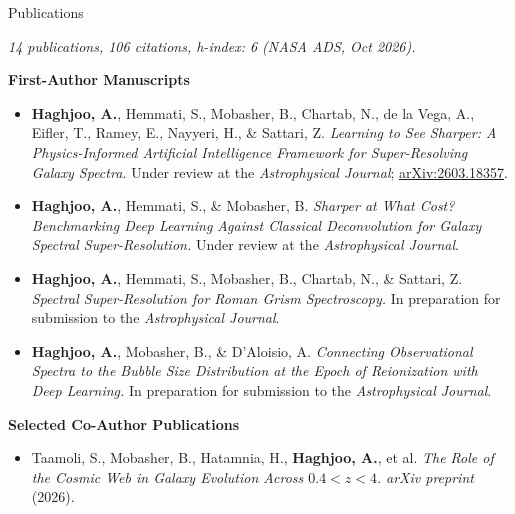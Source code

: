 \documentclass[]{kyvernitis-resume}
\begin{document}
\begin{section}{Publications}

\textit{14 publications, 106 citations, h-index: 6 (NASA ADS, Oct 2026).}

\vspace{0.2cm}

\textbf{First-Author Manuscripts}

\begin{itemize}

\item \textbf{Haghjoo, A.}, Hemmati, S., Mobasher, B., Chartab, N., de la Vega, A., Eifler, T., Ramey, E., Nayyeri, H., \& Sattari, Z.
\textit{Learning to See Sharper: A Physics-Informed Artificial Intelligence Framework for Super-Resolving Galaxy Spectra.}
Under review at the \textit{Astrophysical Journal}; \href{https://arxiv.org/abs/2603.18357}{arXiv:2603.18357}.

\item \textbf{Haghjoo, A.}, Hemmati, S., \& Mobasher, B.
\textit{Sharper at What Cost? Benchmarking Deep Learning Against Classical Deconvolution for Galaxy Spectral Super-Resolution.}
Under review at the \textit{Astrophysical Journal}.

\item \textbf{Haghjoo, A.}, Hemmati, S., Mobasher, B., Chartab, N., \& Sattari, Z.
\textit{Spectral Super-Resolution for Roman Grism Spectroscopy.}
In preparation for submission to the \textit{Astrophysical Journal}.

\item \textbf{Haghjoo, A.}, Mobasher, B., \& D'Aloisio, A.
\textit{Connecting Observational Spectra to the Bubble Size Distribution at the Epoch of Reionization with Deep Learning.}
In preparation for submission to the \textit{Astrophysical Journal}.



\end{itemize}

\vspace{0.2cm}

\textbf{Selected Co-Author Publications}

\begin{itemize}

\item Taamoli, S., Mobasher, B., Hatamnia, H., \textbf{Haghjoo, A.}, et al.
\textit{The Role of the Cosmic Web in Galaxy Evolution Across $0.4<z<4$.}
\textit{arXiv preprint} (2026).


\end{itemize}
\end{section}
\end{document}
